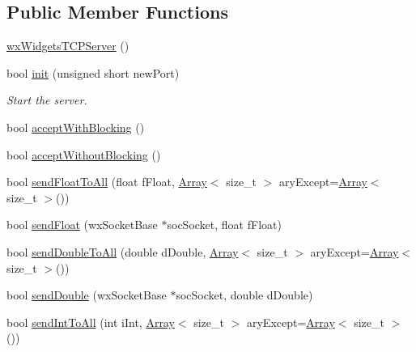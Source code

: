 \subsection*{Public Member Functions}
\begin{DoxyCompactItemize}
\item 
\mbox{\hyperlink{class_rad_j_a_v_1_1_networking_1_1wx_widgets_t_c_p_server_ac000741f10b0be7e6800f948fba6cdc8}{wx\+Widgets\+T\+C\+P\+Server}} ()
\item 
bool \mbox{\hyperlink{class_rad_j_a_v_1_1_networking_1_1wx_widgets_t_c_p_server_aa0c34e3462f10c401629f9cea3a113a4}{init}} (unsigned short new\+Port)
\begin{DoxyCompactList}\small\item\em Start the server. \end{DoxyCompactList}\item 
bool \mbox{\hyperlink{class_rad_j_a_v_1_1_networking_1_1wx_widgets_t_c_p_server_a09b2a943dc69cab1aa3bf1573a8f72c1}{accept\+With\+Blocking}} ()
\item 
bool \mbox{\hyperlink{class_rad_j_a_v_1_1_networking_1_1wx_widgets_t_c_p_server_a1e78417fa012bebbc21fbcf8557c8008}{accept\+Without\+Blocking}} ()
\item 
bool \mbox{\hyperlink{class_rad_j_a_v_1_1_networking_1_1wx_widgets_t_c_p_server_a632a5b94a16bcbd725fb4a9d1f4f73b0}{send\+Float\+To\+All}} (float f\+Float, \mbox{\hyperlink{class_rad_j_a_v_1_1_array}{Array}}$<$ size\+\_\+t $>$ ary\+Except=\mbox{\hyperlink{class_rad_j_a_v_1_1_array}{Array}}$<$ size\+\_\+t $>$())
\item 
bool \mbox{\hyperlink{class_rad_j_a_v_1_1_networking_1_1wx_widgets_t_c_p_server_a2c0f9bf6466f22c44cba8921b2086d4a}{send\+Float}} (wx\+Socket\+Base $\ast$soc\+Socket, float f\+Float)
\item 
bool \mbox{\hyperlink{class_rad_j_a_v_1_1_networking_1_1wx_widgets_t_c_p_server_a24e90f9fd8da7f16c365f4e3ae00c565}{send\+Double\+To\+All}} (double d\+Double, \mbox{\hyperlink{class_rad_j_a_v_1_1_array}{Array}}$<$ size\+\_\+t $>$ ary\+Except=\mbox{\hyperlink{class_rad_j_a_v_1_1_array}{Array}}$<$ size\+\_\+t $>$())
\item 
bool \mbox{\hyperlink{class_rad_j_a_v_1_1_networking_1_1wx_widgets_t_c_p_server_a9cc3924985547cc4e63be3d91b57e94a}{send\+Double}} (wx\+Socket\+Base $\ast$soc\+Socket, double d\+Double)
\item 
bool \mbox{\hyperlink{class_rad_j_a_v_1_1_networking_1_1wx_widgets_t_c_p_server_aabb486086e700bbc52729d91b4500d0c}{send\+Int\+To\+All}} (int i\+Int, \mbox{\hyperlink{class_rad_j_a_v_1_1_array}{Array}}$<$ size\+\_\+t $>$ ary\+Except=\mbox{\hyperlink{class_rad_j_a_v_1_1_array}{Array}}$<$ size\+\_\+t $>$())

\end{DoxyCompactItemize}
